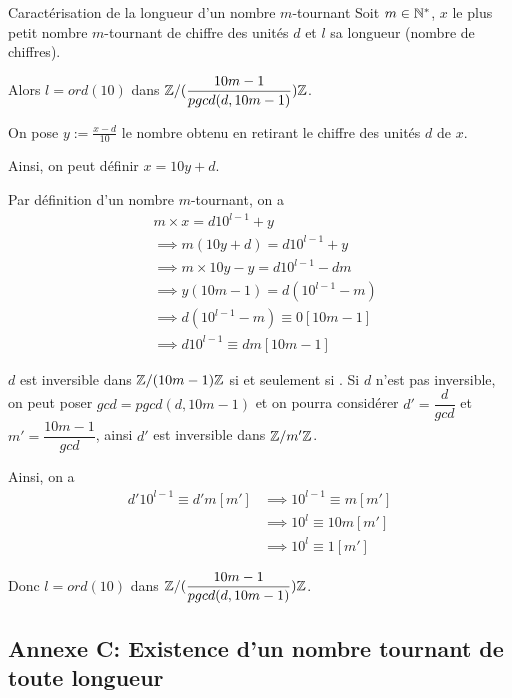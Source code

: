 \documentclass[a4paper, 12pt]{article}
\begin{document}
\begin{theoreme}{Caractérisation de la longueur d'un nombre $m$-tournant}{}
    Soit $m \in \mathbb{N}^*$, $x$ le plus petit nombre $m$-tournant de chiffre des unités $d$ et $l$ sa longueur (nombre de chiffres).

    Alors $l = ord(10)$ dans $\mathbb{Z}/(\dfrac{10m - 1}{pgcd(d, 10m - 1)})\mathbb{Z}$.
\end{theoreme}

\begin{demonstration}
    On pose $y := \frac{x - d}{10}$ le nombre obtenu en retirant le chiffre des unités $d$ de $x$.

    Ainsi, on peut définir $x = 10y + d$.

    Par définition d'un nombre $m$-tournant, on a
    \begin{align*}
        &m \times x = d10^{l - 1} + y \\
        &\implies m(10y + d) = d10^{l - 1} + y \\
        &\implies m \times 10y - y = d10^{l - 1} - dm \\
        &\implies y(10m - 1) = d(10^{l - 1} - m) \\
        &\implies d(10^{l - 1} - m) \equiv 0 [10m - 1] \\
        &\implies d 10^{l - 1} \equiv dm [10m - 1]
    \end{align*}

    $d$ est inversible dans $\mathbb{Z}/(10m - 1)\mathbb{Z}$ si et seulement si .
    Si $d$ n'est pas inversible, on peut poser $gcd = pgcd(d, 10m - 1)$ et on pourra considérer $d' = \dfrac{d}{gcd}$ et $m' = \dfrac{10m - 1}{gcd}$, ainsi $d'$ est inversible dans $\mathbb{Z}/m'\mathbb{Z}$.

    Ainsi, on a
    \begin{align*}
        d' 10^{l - 1} \equiv d'm [m'] &\implies 10^{l - 1} \equiv m [m'] \\
        &\implies 10^l \equiv 10m [m'] \\
        &\implies 10^l \equiv 1 [m']
    \end{align*}

    Donc $l = ord(10)$ dans $\mathbb{Z}/(\dfrac{10m - 1}{pgcd(d, 10m - 1)})\mathbb{Z}$.
\end{demonstration}

\subsection*{Annexe C: Existence d'un nombre tournant de toute longueur}
\end{document}
